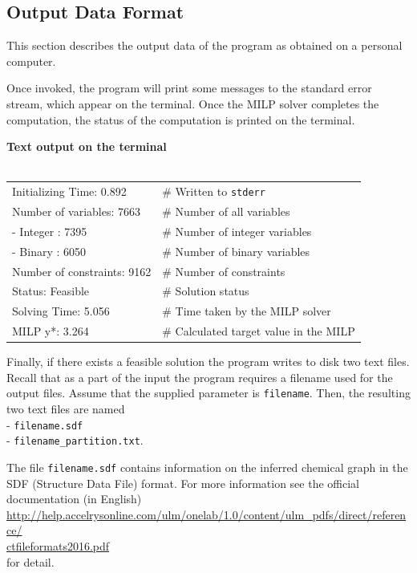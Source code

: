 \documentclass[11pt, titlepage, dvipdfmx, twoside]{article}
\begin{document}
\subsection{Output Data Format}
\label{sec:section3_4}

This section describes the output data of the program as
obtained on a personal computer.

Once invoked, the program will print some messages to the standard error
stream, which appear on the terminal.
Once the MILP solver completes the computation,
the status of the computation is printed on the terminal.

\bigskip

\begin{oframed}
{\bf Text output on the terminal}\\\\
\begin{tabular}{l l}
 Initializing Time: 0.892          &         \# Written to {\tt stderr} \\
Number of variables: 7663          &         \# Number of all variables \\
 - Integer : 7395                  &         \# Number of integer variables \\
 - Binary  : 6050                  &         \# Number of binary variables \\
 Number of constraints: 9162       &         \# Number of constraints \\
Status: Feasible 				           &         \# Solution status \\
Solving Time: 5.056                &         \# Time taken by the MILP solver \\
MILP y*: 3.264  		               &         \# Calculated target value in the MILP  \\
\end{tabular}



\end{oframed}

Finally, if there exists a feasible solution the program writes to disk two text files.
Recall that as a part of the input the program requires a filename
used for the output files. 
Assume that the supplied parameter is {\tt filename}.
Then, the resulting two text files are named \\
- {\tt filename.sdf} \\
- {\tt filename\_partition.txt}. 

\noindent
The file {\tt filename.sdf} contains information
on the inferred chemical graph in the SDF (Structure Data File)
format.
For more information see the official documentation (in English) \\
\url{http://help.accelrysonline.com/ulm/onelab/1.0/content/ulm_pdfs/direct/reference/}\\
 \url{ctfileformats2016.pdf} \\
for detail.
\end{document}
